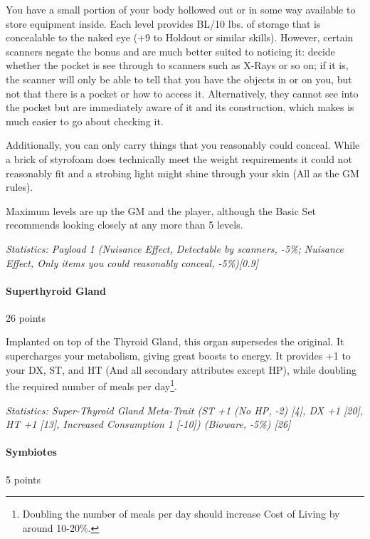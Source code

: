 \begin{multicols*}{3}
	You have a small portion of your body hollowed out or in some way available to store equipment inside. Each level provides BL/10 lbs. of storage that is concealable to the naked eye (+9 to Holdout or similar skills). However, certain scanners negate the bonus and are much better suited to noticing it: decide whether the pocket is see through to scanners such as X-Rays or so on; if it is, the scanner will only be able to tell that you have the objects in or on you, but not that there is a pocket or how to access it. Alternatively, they cannot see into the pocket but are immediately aware of it and its construction, which makes is much easier to go about checking it.
	
	Additionally, you can only carry things that you reasonably could conceal. While a brick of styrofoam does technically meet the weight requirements it could not reasonably fit and a strobing light might shine through your skin (All as the GM rules).
	
	Maximum levels are up the GM and the player, although the Basic Set recommends looking closely at any more than 5 levels.
	
	\textit{\textcolor{OliveGreen}{Statistics: Payload 1 (Nuisance Effect, Detectable by scanners, -5\%; Nuisance Effect, Only items you could reasonably conceal, -5\%)[0.9]}}
	
	\paragraph{Superthyroid Gland}
	\begin{flushright}
		26 points
	\end{flushright}
	
	Implanted on top of the Thyroid Gland, this organ supersedes the original. It supercharges your metabolism, giving great boosts to energy. It provides +1 to your DX, ST, and HT (And all secondary attributes except HP), while doubling the required number of meals per day\footnote{Doubling the number of meals per day should increase Cost of Living by around 10-20\%.}.
	
	\textit{\textcolor{OliveGreen}{Statistics: Super-Thyroid Gland Meta-Trait (ST +1 (No HP, -2) [4], DX +1 [20], HT +1 [13], Increased Consumption 1 [-10]) (Bioware, -5\%) [26]}}
	
	\paragraph{Symbiotes}
	\begin{flushright}
		5 points
	\end{flushright}
	

\end{multicols*}
